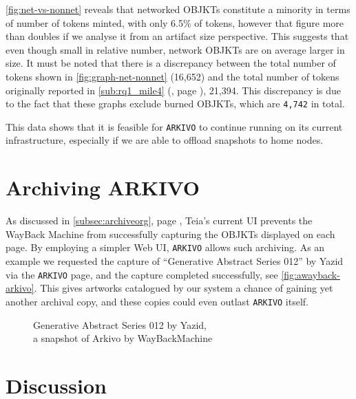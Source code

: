 \autoref{fig:net-vs-nonnet} reveals that networked OBJKTs constitute a minority in terms of number of tokens minted, with only 6.5\% of tokens, however that figure more than doubles if we analyse it from an artifact size perspective. This suggests that even though small in relative number, network OBJKTs are on average larger in size. It must be noted that there is a discrepancy between the total number of tokens shown in \autoref{fig:graph-net-nonnet} (16,652) and the total number of tokens originally reported in \autoref{sub:rq1_mile4} (, page \pageref{sub:rq1_mile4}), 21,394. This discrepancy is due to the fact that these graphs exclude burned OBJKTs, which are \texttt{4,742} in total.

This data shows that it is feasible for \texttt{ARKIVO} to continue running on its current infrastructure, especially if we are able to offload snapshots to home nodes.

\section{Archiving ARKIVO}

As discussed in \autoref{subsec:archiveorg}, page \pageref{subsec:archiveorg}, Teia's current UI prevents the WayBack Machine from successfully capturing the OBJKTs displayed on each page. By employing a simpler Web UI, \texttt{ARKIVO} allows such archiving. As an example we requested the capture of ``Generative Abstract Series 012'' by Yazid via the \texttt{ARKIVO} page, and the capture completed successfully, see \autoref{fig:awayback-arkivo}. This gives artworks catalogued by our system a chance of gaining yet another archival copy, and these copies could even outlast \texttt{ARKIVO} itself.


\begin{figure}[h]
    \centering
    \captionsetup{justification=centering}
    \begingroup
    \setlength{\fboxsep}{0pt} %
    \setlength{\fboxrule}{1pt} %
    \endgroup
    \caption[WayBackMachine snapshots Arkivo]{Generative Abstract Series 012 by Yazid, \\ a snapshot of Arkivo by WayBackMachine}
    \label{fig:awayback-arkivo}
\end{figure}


\section{Discussion}

